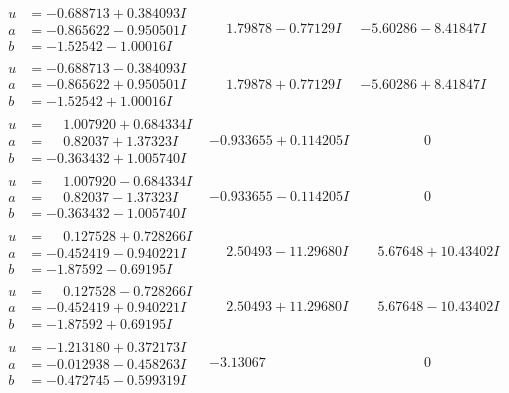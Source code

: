 \documentclass[1p]{elsarticle_modified}
\theoremstyle{definition}
\begin{document}
$$\begin{array}{c|c|c}
\begin{aligned}
u &= -0.688713 + 0.384093 I \\
a &= -0.865622 - 0.950501 I \\
b &= -1.52542 - 1.00016 I\end{aligned}
 & \phantom{-}1.79878 - 0.77129 I & -5.60286 - 8.41847 I \\ \hline\begin{aligned}
u &= -0.688713 - 0.384093 I \\
a &= -0.865622 + 0.950501 I \\
b &= -1.52542 + 1.00016 I\end{aligned}
 & \phantom{-}1.79878 + 0.77129 I & -5.60286 + 8.41847 I \\ \hline\begin{aligned}
u &= \phantom{-}1.007920 + 0.684334 I \\
a &= \phantom{-}0.82037 + 1.37323 I \\
b &= -0.363432 + 1.005740 I\end{aligned}
 & -0.933655 + 0.114205 I & \phantom{-0.000000 } 0 \\ \hline\begin{aligned}
u &= \phantom{-}1.007920 - 0.684334 I \\
a &= \phantom{-}0.82037 - 1.37323 I \\
b &= -0.363432 - 1.005740 I\end{aligned}
 & -0.933655 - 0.114205 I & \phantom{-0.000000 } 0 \\ \hline\begin{aligned}
u &= \phantom{-}0.127528 + 0.728266 I \\
a &= -0.452419 - 0.940221 I \\
b &= -1.87592 - 0.69195 I\end{aligned}
 & \phantom{-}2.50493 - 11.29680 I & \phantom{-}5.67648 + 10.43402 I \\ \hline\begin{aligned}
u &= \phantom{-}0.127528 - 0.728266 I \\
a &= -0.452419 + 0.940221 I \\
b &= -1.87592 + 0.69195 I\end{aligned}
 & \phantom{-}2.50493 + 11.29680 I & \phantom{-}5.67648 - 10.43402 I \\ \hline\begin{aligned}
u &= -1.213180 + 0.372173 I \\
a &= -0.012938 - 0.458263 I \\
b &= -0.472745 - 0.599319 I\end{aligned}
 & -3.13067\phantom{ +0.000000I} & \phantom{-0.000000 } 0 \\ \hline\begin{aligned}

\end{aligned}
\end{array}$$
\end{document}
